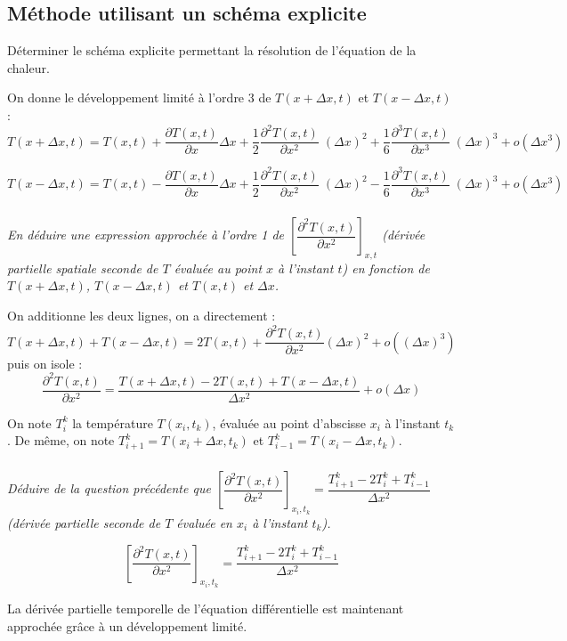 \documentclass[10pt,fleqn]{article} %
\begin{document}
\subsection{Méthode utilisant un schéma explicite}
\ifprof
\else
\begin{obj}
Déterminer le schéma explicite permettant la résolution de l'équation de la chaleur.
\end{obj}

On donne le développement limité à l'ordre 3 de $T(x+\Delta x,t)$ et $T(x-\Delta x,t)$ :
$$
T(x+\Delta x,t)=T(x,t)+\dfrac{\partial T(x,t)}{\partial x}\Delta x 
+ \dfrac{1}{2}\dfrac{\partial^2 T(x,t)}{\partial x^2} \;\left( \Delta x\right)^2 
+ \dfrac{1}{6}\dfrac{\partial^3 T(x,t)}{\partial x^3} \;\left( \Delta x\right)^3 
+ o\left( \Delta x^3\right)
$$

$$
T(x-\Delta x,t)=T(x,t)-\dfrac{\partial T(x,t)}{\partial x}\Delta x 
+ \dfrac{1}{2}\dfrac{\partial^2 T(x,t)}{\partial x^2} \;\left( \Delta x\right)^2 
- \dfrac{1}{6}\dfrac{\partial^3 T(x,t)}{\partial x^3}\;\left( \Delta x\right)^3 
+ o\left( \Delta x^3\right)
$$
\fi

\subparagraph{}\textit{En déduire une expression approchée à l'ordre 1 de
 $\left[\dfrac{\partial^2 T(x,t)}{\partial x^2}\right]_{x,t}$ (dérivée partielle spatiale seconde de 
 $T$ évaluée au point $x$ à l'instant $t$) en fonction de $T(x+\Delta x,t)$, $T(x-\Delta x,t)$ et 
$T(x,t)$ et $\Delta x$.}
\ifprof
\begin{corrige}
On additionne les deux lignes, on a directement :
$$
T(x+\Delta x,t)+T(x-\Delta x,t)=2T(x,t)
+ \dfrac{\partial^2 T(x,t)}{\partial x^2}(\Delta x)^2
+o((\Delta x)^3)$$
puis on isole : 
$$
\dfrac{\partial^2 T(x,t)}{\partial x^2} 
=
\dfrac{T(x+\Delta x,t)-2T(x,t) + T(x-\Delta x,t)}{\Delta x^2 }+ o\left(\Delta x\right)
$$
\end{corrige}

\else
\fi

\vspace{.5cm}

On note $T_i^k$ la température $T\left(x_i,t_k\right)$, évaluée au point d'abscisse $x_i$ à
 l'instant $t_k$. De même, on note $T_{i+1}^k=T\left(x_i + \Delta x,t_k \right)$ et 
$T_{i-1}^k=T\left(x_i - \Delta x,t_k \right)$.

\subparagraph{}\textit{Déduire de la question précédente que  
$\left[\dfrac{\partial^2 T(x,t)}{\partial x^2}\right]_{x_i,t_k} =
\dfrac{T_{i+1}^k-2T_{i}^k + T_{i-1}^k}{\Delta x^2 } $ (dérivée partielle seconde de 
$T$ évaluée en $x_i$ à l'instant $t_k$).}
\ifprof
\begin{corrige}
$$
\left[\dfrac{\partial^2 T(x,t)}{\partial x^2}\right]_{x_i,t_k} 
=
\dfrac{T_{i+1}^k-2T_{i}^k + T_{i-1}^k}{\Delta x^2 }
$$
\end{corrige}
\else
\fi
\ifprof
\else
\vspace{0.5cm}
La dérivée partielle temporelle de l'équation différentielle est maintenant approchée grâce à un
développement limité.
\end{document}
